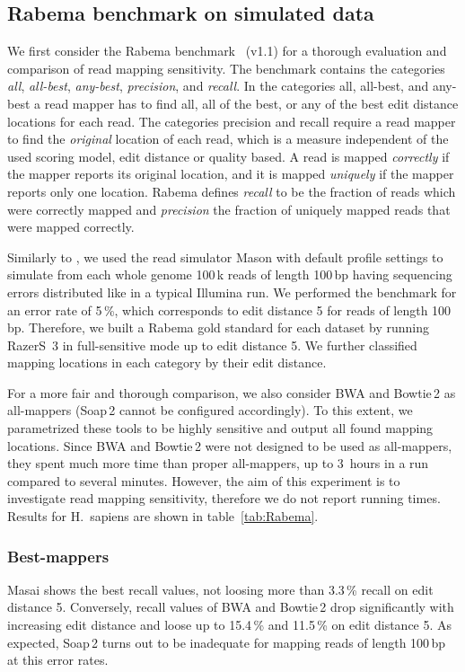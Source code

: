 \subsection{Rabema benchmark on simulated data}

We first consider the Rabema benchmark~\citep{Holtgrewe2011} (v1.1) for a thorough evaluation and comparison of read mapping sensitivity.
The benchmark contains the categories \emph{all}, \emph{all-best}, \emph{any-best}, \emph{precision}, and \emph{recall}.
In the categories all, all-best, and any-best a read mapper has to find all, all of the best, or any of the best edit distance locations for each read.
The categories precision and recall require a read mapper to find the \emph{original} location of each read, which is a measure independent of the used scoring model, \eg edit distance or quality based.
A read is mapped \emph{correctly} if the mapper reports its original location, 
and it is mapped \emph{uniquely} if the mapper reports only one location.
Rabema defines \emph{recall} to be the fraction of reads which were correctly mapped and \emph{precision} the fraction of uniquely mapped reads that were mapped correctly.

Similarly to \citep{Bowtie2}, we used the read simulator Mason \citep{SeqAnReadSimulator} with default profile settings to simulate from each whole genome 100\,k reads of length 100\,bp having sequencing errors distributed like in a typical Illumina run.
We performed the benchmark for an error rate of 5\,\%, which corresponds to edit distance 5 for reads of length 100\,bp. Therefore, we built a Rabema gold standard for each dataset by running RazerS~3 in full-sensitive mode up to edit distance 5. We further classified mapping locations in each category by their edit distance.

For a more fair and thorough comparison, we also consider BWA and Bowtie\,2 as all-mappers (Soap\,2 cannot be configured accordingly).
To this extent, we parametrized these tools to be highly sensitive and output all found mapping locations.
Since BWA and Bowtie\,2 were not designed to be used as all-mappers, they spent much more time than proper all-mappers, \ie up to 3~hours in a run compared to several minutes.
However, the aim of this experiment is to investigate read mapping sensitivity, therefore we do not report running times.
Results for H.~sapiens are shown in table~\ref{tab:Rabema}.

\subsubsection{Best-mappers}
Masai shows the best recall values, not loosing more than 3.3\,\% recall on edit distance 5.
Conversely, recall values of BWA and Bowtie\,2 drop significantly with increasing edit distance and loose up to 15.4\,\% and 11.5\,\% on edit distance 5.
As expected, Soap\,2 turns out to be inadequate for mapping reads of length 100\,bp at this error rates.

